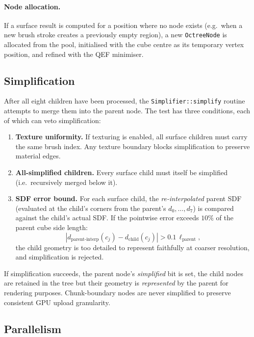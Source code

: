\documentclass[10pt,a4paper]{article}
\begin{document}
\paragraph{Node allocation.}
If a surface result is computed for a position where no node exists
(e.g.\ when a new brush stroke creates a previously empty region), a new
\lstinline{OctreeNode} is allocated from the pool, initialised with the
cube centre as its temporary vertex position, and refined with the QEF
minimiser.

\subsection{Simplification}
\label{sec:shape:simplify}

After all eight children have been processed, the
\lstinline{Simplifier::simplify} routine attempts to merge them into the
parent node.  The test has three conditions, each of which can veto
simplification:

\begin{enumerate}
  \item \textbf{Texture uniformity.} If texturing is enabled, all surface
    children must carry the same brush index.  Any texture boundary blocks
    simplification to preserve material edges.
  \item \textbf{All-simplified children.} Every surface child must itself
    be simplified (i.e.\ recursively merged below it).
  \item \textbf{SDF error bound.} For each surface child, the
    \emph{re-interpolated} parent SDF (evaluated at the child's corners
    from the parent's $d_0,\ldots,d_7$) is compared against the child's
    actual SDF.  If the pointwise error exceeds
    $10\%$ of the parent cube side length:
    \[
      |d_{\text{parent-interp}}(c_j) - d_{\text{child}}(c_j)| >
        0.1\,\ell_{\text{parent}},
    \]
    the child geometry is too detailed to represent faithfully at coarser
    resolution, and simplification is rejected.
\end{enumerate}

\noindent
If simplification succeeds, the parent node's \emph{simplified} bit is
set, the child nodes are retained in the tree but their geometry is
\emph{represented} by the parent for rendering purposes.  Chunk-boundary
nodes are never simplified to preserve consistent GPU upload granularity.

\subsection{Parallelism}
\end{document}
